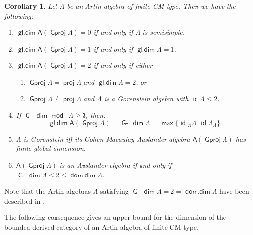\documentclass[oneside, a4paper,reqno]{amsart}
\numberwithin{equation}{section}
\newtheorem{cor}[thm]{Corollary}
\theoremstyle{definition}
\begin{document}
\begin{cor} Let $\Lambda$ be an Artin algebra of finite CM-type.
Then we have the following:
\begin{enumerate}
\item $\operatorname*{\mathsf{gl.dim}}\mathsf{A}({\operatorname{\mathsf{Gproj}}\nolimits}\Lambda) = 0$ if and only if $\Lambda$ is semisimple.
\item $\operatorname*{\mathsf{gl.dim}}\mathsf{A}({\operatorname{\mathsf{Gproj}}\nolimits}\Lambda) = 1$ if and only if $\operatorname*{\mathsf{gl.dim}}\Lambda = 1$.
\item $\operatorname*{\mathsf{gl.dim}}\mathsf{A}({\operatorname{\mathsf{Gproj}}\nolimits}\Lambda) = 2$ if and only if  either
\begin{enumerate}
\item ${\operatorname{\mathsf{Gproj}}\nolimits}\Lambda = \operatorname*{\mathsf{proj}}\Lambda$ and $\operatorname*{\mathsf{gl.dim}}\Lambda = 2$, or
\item ${\operatorname{\mathsf{Gproj}}\nolimits}\Lambda \neq \operatorname*{\mathsf{proj}}\Lambda$ and $\Lambda$ is a Gorenstein algebra with $\operatorname*{\mathsf{id}}\Lambda \leq 2$.
\end{enumerate}
\item If  $\operatorname*{\mathsf{G}-\!}\operatorname*{\mathsf{dim}}\operatorname*{\mathsf{mod}-\!}\Lambda \geq 3$, then:
\[\operatorname*{\mathsf{gl.dim}}\mathsf{A}({\operatorname{\mathsf{Gproj}}\nolimits}\Lambda) = \operatorname*{\mathsf{G}-\!}\operatorname*{\mathsf{dim}}\Lambda = \operatorname*{\mathsf{max}}\big\{\operatorname*{\mathsf{id}}{_{\Lambda}}\Lambda,
\operatorname*{\mathsf{id}}\Lambda_{\Lambda} \big\}\]
\item $\Lambda$ is Gorenstein iff its Cohen-Macaulay Auslander algebra
$\mathsf{A}({\operatorname{\mathsf{Gproj}}\nolimits}\Lambda)$ has finite global dimension.
\item $\mathsf{A}({\operatorname{\mathsf{Gproj}}\nolimits}\Lambda)$ is an Auslander algebra if and
only  if $\operatorname*{\mathsf{G}-\!}\operatorname*{\mathsf{dim}}\Lambda \leq 2\leq \operatorname*{\mathsf{dom.dim}}\Lambda$.
\end{enumerate}
\end{cor}

Note that the Artin algebras $\Lambda$ satisfying  $\operatorname*{\mathsf{G}-\!}\operatorname*{\mathsf{dim}}\Lambda
= 2 = \operatorname*{\mathsf{dom.dim}}\Lambda$ have been described in \cite{AS:gor}.

The following consequence gives an upper bound for the dimension of
the bounded derived category of an Artin algebra of finite CM-type.
\end{document}

